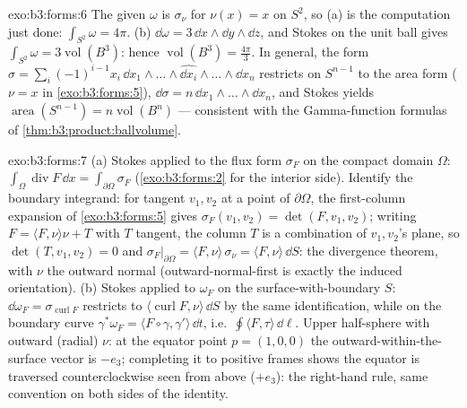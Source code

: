 \begin{solution}{exo:b3:forms:6}
The given $\omega$ is $\sigma_\nu$ for $\nu(x) = x$ on
$S^2$, so (a) is the computation just done:
$\int_{S^2}\omega = 4\pi$. (b) $\dd\omega = 3\,\dd
x\wedge\dd y\wedge\dd z$, and Stokes on the unit ball gives
$\int_{S^2}\omega = 3\operatorname{vol}(B^3)$: hence
$\operatorname{vol}(B^3) = \frac{4\pi}3$. In general, the
form $\sigma = \sum_i(-1)^{i-1}x_i\,\dd
x_1\wedge\dots\wedge\widehat{\dd x_i}\wedge\dots\wedge\dd
x_n$ restricts on $S^{n-1}$ to the area form ($\nu = x$ in
\cref{exo:b3:forms:5}), $\dd\sigma = n\,\dd
x_1\wedge\dots\wedge\dd x_n$, and Stokes yields
$\operatorname{area}(S^{n-1}) = n\operatorname{vol}(B^n)$
--- consistent with the Gamma-function formulas of
\cref{thm:b3:product:ballvolume}.
\end{solution}

\begin{solution}{exo:b3:forms:7}
(a) Stokes applied to the flux form $\sigma_F$ on the
compact domain $\Omega$:
$\int_\Omega\operatorname{div}F\,\dd x =
\int_{\partial\Omega}\sigma_F$ (\cref{exo:b3:forms:2} for
the interior side). Identify the boundary integrand: for
tangent $v_1, v_2$ at a point of $\partial\Omega$, the
first-column expansion of \cref{exo:b3:forms:5} gives
$\sigma_F(v_1, v_2) = \det(F, v_1, v_2)$; writing $F =
\langle F, \nu\rangle\nu + T$ with $T$ tangent, the column
$T$ is a combination of $v_1, v_2$'s plane, so $\det(T,
v_1, v_2) = 0$ and
$\sigma_F\vert_{\partial\Omega} = \langle F,
\nu\rangle\,\sigma_\nu = \langle F, \nu\rangle\,\dd S$: the
divergence theorem, with $\nu$ the outward normal
(outward-normal-first is exactly the induced orientation).
(b) Stokes applied to $\omega_F$ on the
surface-with-boundary $S$: $\dd\omega_F =
\sigma_{\operatorname{curl}F}$ restricts to
$\langle\operatorname{curl}F, \nu\rangle\,\dd S$ by the same
identification, while on the boundary curve
$\gamma^*\omega_F = \langle F\circ\gamma,
\gamma'\rangle\,\dd t$, i.e.\ $\oint\langle F,
\tau\rangle\,\dd\ell$. Upper half-sphere with outward
(radial) $\nu$: at the equator point $p = (1,0,0)$ the
outward-within-the-surface vector is $-e_3$; completing it
to positive frames shows the equator is traversed
counterclockwise seen from above ($+e_3$): the right-hand
rule, same convention on both sides of the identity.
\end{solution}

